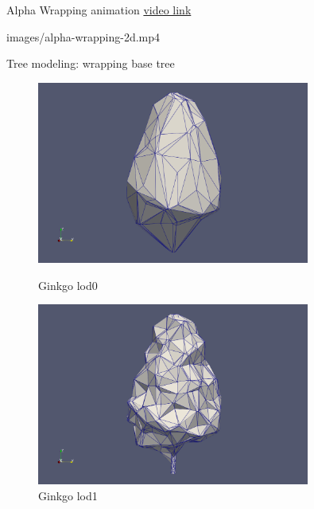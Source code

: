 \documentclass[12pt]{beamer}
\begin{document}
\begin{frame}{Alpha Wrapping animation}
  \href{https://youtu.be/xIIDolWCrgU}{video link}
  \begin{center}
    \movie[width=1\textwidth,height=0.8\textheight,poster,showcontrols]{}
    {images/alpha-wrapping-2d.mp4}
\end{center}
\end{frame}

\begin{frame}{Tree modeling: wrapping base tree}
  \begin{figure}[H]
    \centering
    \begin{minipage}{0.49\textwidth}
        \centering
        \includegraphics[width=0.8\textwidth]{images/gingko_lod0.png}
        \caption{Ginkgo lod0}
    \end{minipage}\hfill
    \begin{minipage}{0.49\textwidth}
        \centering
        \includegraphics[width=0.8\textwidth]{images/gingko_lod1.png}
        \caption{Ginkgo lod1}
    \end{minipage}
\end{figure}


\end{frame}
\end{document}

